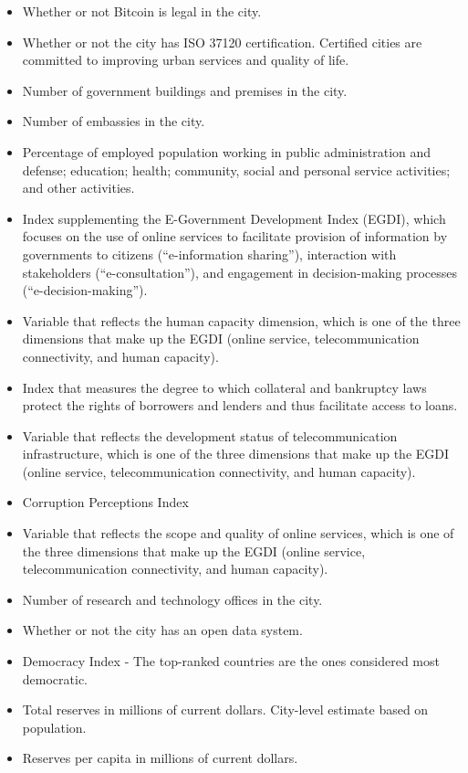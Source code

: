 \documentclass[
  english,
  12pt,
  a4paper,
]{scrartcl}
\providecommand{\tightlist}{%
  \setlength{\itemsep}{0pt}\setlength{\parskip}{0pt}}
\begin{document}
\begin{itemize}
\tightlist
\item
  Whether or not Bitcoin is legal in the city.
\item
  Whether or not the city has ISO 37120 certification. Certified cities
  are committed to improving urban services and quality of life.
\item
  Number of government buildings and premises in the city.
\item
  Number of embassies in the city.
\item
  Percentage of employed population working in public administration and
  defense; education; health; community, social and personal service
  activities; and other activities.
\item
  Index supplementing the E-Government Development Index (EGDI), which
  focuses on the use of online services to facilitate provision of
  information by governments to citizens (``e-information sharing''),
  interaction with stakeholders (``e-consultation''), and engagement in
  decision-making processes (``e-decision-making'').
\item
  Variable that reflects the human capacity dimension, which is one of
  the three dimensions that make up the EGDI (online service,
  telecommunication connectivity, and human capacity).
\item
  Index that measures the degree to which collateral and bankruptcy laws
  protect the rights of borrowers and lenders and thus facilitate access
  to loans.
\item
  Variable that reflects the development status of telecommunication
  infrastructure, which is one of the three dimensions that make up the
  EGDI (online service, telecommunication connectivity, and human
  capacity).
\item
  Corruption Perceptions Index
\item
  Variable that reflects the scope and quality of online services, which
  is one of the three dimensions that make up the EGDI (online service,
  telecommunication connectivity, and human capacity).
\item
  Number of research and technology offices in the city.
\item
  Whether or not the city has an open data system.
\item
  Democracy Index - The top-ranked countries are the ones considered
  most democratic.
\item
  Total reserves in millions of current dollars. City-level estimate
  based on population.
\item
  Reserves per capita in millions of current dollars.
\end{itemize}
\end{document}

